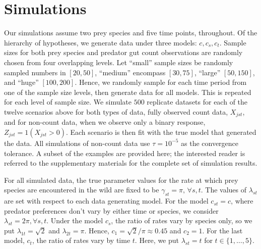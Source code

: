 \section{Simulations}
\label{sec:sim}


Our simulations assume two prey species and five time points, throughout.  Of the hierarchy of hypotheses, we generate data under three models: $c, c_s, c_t$.  Sample sizes for both prey species and predator gut count observations are randomly chosen from four overlapping levels.  Let ``small'' sample sizes be randomly sampled numbers in $[20,50]$, ``medium'' encompass $[30,75]$, ``large'' $[50,150]$, and ``huge'' $[100,200]$.  Hence, we randomly sample for each time period from one of the sample size levels, then generate data for all models.  This is repeated for each level of sample size.  We simulate $500$ replicate datasets for each of the twelve scenarios above for both types of data, fully observed count data, $X_{jst}$, and for non-count data, when we observe only a binary response, $Z_{jst} = 1(X_{jst}>0)$.  Each scenario is then fit with the true model that generated the data.  All simulations of non-count data use $\tau = 10^{-5}$ as the convergence tolerance.  A subset of the examples are provided here; the interested reader is referred to the supplementary materials for the complete set of simulation results.

For all simulated data, the true parameter values for the rate at which prey species are encountered in the wild are fixed to be $\gamma_{st} = \pi, \, \forall s,t$. The values of $\lambda_{st}$ are set with respect to each data generating model.  For the model $c_{st} = c$, where predator preferences don't vary by either time or species, we consider $\lambda_{st} = 2\pi, \forall s,t$.  Under the model $c_s$, the ratio of rates vary by species only, so we put $\lambda_{1t} = \sqrt{2}$ and $\lambda_{2t} = \pi$.  Hence, $c_1 = \sqrt{2}/\pi \approx 0.45$ and $c_2 = 1$.  For the last model, $c_t$, the ratio of rates vary by time $t$.  Here, we put $\lambda_{st} = t$ for $t \in \{1, \ldots, 5 \}$.  


